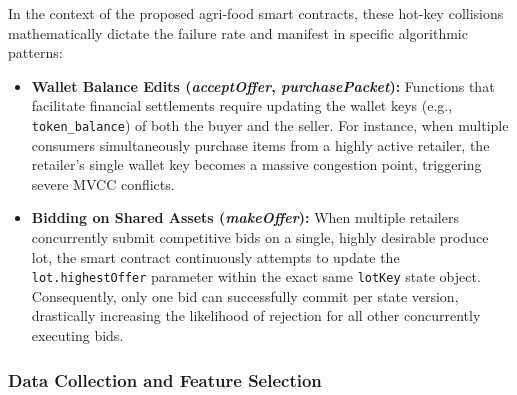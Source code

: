\documentclass[manuscript,screen]{acmart}
\begin{document}
  In the context of the proposed agri-food smart contracts, these hot-key collisions mathematically dictate the failure rate and manifest in specific algorithmic patterns:
  \begin{itemize}
      \item \textbf{Wallet Balance Edits (\textit{acceptOffer}, \textit{purchasePacket}):} Functions that facilitate financial settlements require updating the wallet keys (e.g., \texttt{token\_balance}) of both the buyer and the seller. For instance, when multiple consumers simultaneously purchase items from a highly active retailer, the retailer's single wallet key becomes a massive congestion point, triggering severe MVCC conflicts.
      \item \textbf{Bidding on Shared Assets (\textit{makeOffer}):} When multiple retailers concurrently submit competitive bids on a single, highly desirable produce lot, the smart contract continuously attempts to update the \texttt{lot.highestOffer} parameter within the exact same \texttt{lotKey} state object. Consequently, only one bid can successfully commit per state version, drastically increasing the likelihood of rejection for all other concurrently executing bids.
  \end{itemize}
   
  
  \subsubsection{Data Collection and Feature Selection}
\end{document}
